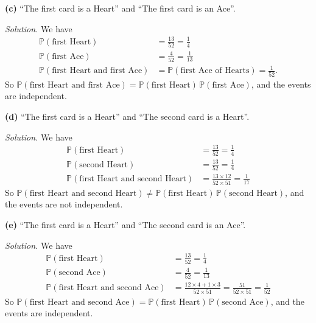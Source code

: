 \documentclass[
  a4paper,
]{book}
\theoremstyle{definition}
\theoremstyle{definition}
\theoremstyle{definition}
\theoremstyle{definition}
\theoremstyle{remark}
\begin{document}
\textbf{(c)} ``The first card is a Heart'' and ``The first card is an Ace''.

\begin{myanswers}
\emph{Solution.}
We have
\begin{align*}
\mathbb P(\text{first Heart}) &= \frac{13}{52} = \frac14 \\
\mathbb P(\text{first Ace}) &= \frac{4}{52} = \frac1{13} \\
\mathbb P(\text{first Heart and first Ace}) &= \mathbb P(\text{first Ace of Hearts}) = \frac1{52} .
\end{align*}
So \(\mathbb P(\text{first Heart and first Ace}) = \mathbb P(\text{first Heart})\,\mathbb P(\text{first Ace})\), and the events are independent.

\end{myanswers}

\textbf{(d)} ``The first card is a Heart'' and ``The second card is a Heart''.

\begin{myanswers}
\emph{Solution.}
We have
\begin{align*}
\mathbb P(\text{first Heart}) &= \frac{13}{52} = \frac14 \\
\mathbb P(\text{second Heart}) &= \frac{13}{52} = \frac14 \\
\mathbb P(\text{first Heart and second Heart}) &= \frac{13\times 12}{52 \times 51} = \frac{1}{17}
\end{align*}
So \(\mathbb P(\text{first Heart and second Heart}) \neq \mathbb P(\text{first Heart})\,\mathbb P(\text{second Heart})\), and the events are not independent.

\end{myanswers}

\textbf{(e)} ``The first card is a Heart'' and ``The second card is an Ace''.

\begin{myanswers}
\emph{Solution.}
We have
\begin{align*}
\mathbb P(\text{first Heart}) &= \frac{13}{52} = \frac14 \\
\mathbb P(\text{second Ace}) &= \frac{4}{52} = \frac1{13} \\
\mathbb P(\text{first Heart and second Ace}) &= \frac{12\times4 + 1\times 3}{52\times 51} = \frac{51}{52\times 51} = \frac{1}{52}
\end{align*}
So \(\mathbb P(\text{first Heart and second Ace}) = \mathbb P(\text{first Heart})\,\mathbb P(\text{second Ace})\), and the events are independent.

\end{myanswers}
\end{document}

